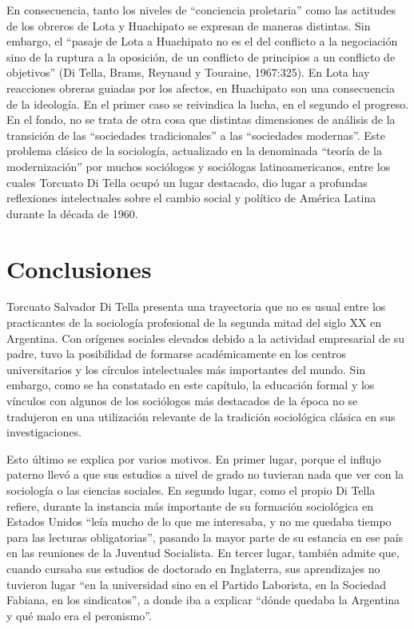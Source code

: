 En consecuencia, tanto los niveles de ``conciencia proletaria'' como las actitudes de los obreros de Lota y Huachipato se expresan de maneras distintas. Sin embargo, el ``pasaje de Lota a Huachipato no es el del conflicto a la negociación sino de la ruptura a la oposición, de un conflicto de principios a un conflicto de objetivos'' (Di Tella, Brams, Reynaud y Touraine, 1967:325). En Lota hay reacciones obreras guiadas por los afectos, en Huachipato son una consecuencia de la ideología. En el primer caso se reivindica la lucha, en el segundo el progreso. En el fondo, no se trata de otra cosa que distintas dimensiones de análisis de la transición de las ``sociedades tradicionales'' a las ``sociedades modernas''. Este problema clásico de la sociología, actualizado en la denominada ``teoría de la modernización'' por muchos sociólogos y sociólogas latinoamericanos, entre los cuales Torcuato Di Tella ocupó un lugar destacado, dio lugar a profundas reflexiones intelectuales sobre el cambio social y político de América Latina durante la década de 1960.

\section{Conclusiones}

Torcuato Salvador Di Tella presenta una trayectoria que no es usual entre los practicantes de la sociología profesional de la segunda mitad del siglo XX en Argentina. Con orígenes sociales elevados debido a la actividad empresarial de su padre, tuvo la posibilidad de formarse académicamente en los centros universitarios y los círculos intelectuales más importantes del mundo. Sin embargo, como se ha constatado en este capítulo, la educación formal y los vínculos con algunos de los sociólogos más destacados de la época no se tradujeron en una utilización relevante de la tradición sociológica clásica en sus investigaciones.

Esto último se explica por varios motivos. En primer lugar, porque el influjo paterno llevó a que sus estudios a nivel de grado no tuvieran nada que ver con la sociología o las ciencias sociales. En segundo lugar, como el propio Di Tella refiere, durante la instancia más importante de su formación sociológica en Estados Unidos ``leía mucho de lo que me interesaba, y no me quedaba tiempo para las lecturas obligatorias'', pasando la mayor parte de su estancia en ese país en las reuniones de la Juventud Socialista. En tercer lugar, también admite que, cuando cursaba sus estudios de doctorado en Inglaterra, sus aprendizajes no tuvieron lugar ``en la universidad sino en el Partido Laborista, en la Sociedad Fabiana, en los sindicatos'', a donde iba a explicar ``dónde quedaba la Argentina y qué malo era el peronismo''.


